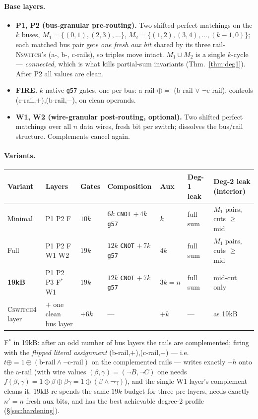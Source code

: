 \documentclass[11pt]{article}
\theoremstyle{remark}
\newcommand{\g}{\texttt{g57}}
\newcommand{\CNOT}{\texttt{CNOT}}
\newcommand{\NSW}{\textsc{Nswitch}}
\newcommand{\CSW}{\textsc{Cswitch4}}
\begin{document}
\paragraph{Base layers.}
\begin{itemize}
\item \textbf{P1, P2 (bus-granular pre-routing).} Two shifted perfect matchings on the $k$
buses, $M_1=\{(0,1),(2,3),\dots\}$, $M_2=\{(1,2),(3,4),\dots,(k{-}1,0)\}$; each matched bus pair
gets \emph{one fresh aux bit} shared by its three rail-\NSW's (a-, b-, c-rails), so triples move
intact. $M_1\cup M_2$ is a single $k$-cycle --- \emph{connected}, which is what kills
partial-sum invariants (Thm.~\ref{thm:deg1}). After P2 all values are clean.
\item \textbf{FIRE.} $k$ native \g{} gates, one per bus:
a-rail $\mathrel{\oplus{=}}$ (b-rail $\vee$ $\neg$c-rail), controls (c-rail,$+$),(b-rail,$-$),
on clean operands.
\item \textbf{W1, W2 (wire-granular post-routing, optional).} Two shifted perfect matchings over
all $n$ data wires, fresh bit per switch; dissolves the bus/rail structure. Complements cancel
again.
\end{itemize}

\paragraph{Variants.}
\begin{center}
\footnotesize
\begin{tabular}{lllllll}
\toprule
Variant & Layers & Gates & Composition & Aux & Deg-1 leak & Deg-2 leak (interior)\\
\midrule
Minimal & P1 P2 F & $10k$ & $6k$ \CNOT{} $+\,4k$ \g & $k$ & full sum & $M_1$ pairs, cuts $\ge$ mid\\
Full & P1 P2 F W1 W2 & $19k$ & $12k$ \CNOT{} $+\,7k$ \g & $4k$ & full sum & $M_1$ pairs, cuts $\ge$ mid\\
\textbf{19kB} & P1 P2 P3 F$^{*}$ W1 & $19k$ & $12k$ \CNOT{} $+\,7k$ \g & $3k=n$ & full sum & mid-cut only\\
\CSW{} layer & $+$ one clean bus layer & $+6k$ & --- & $+k$ & --- & as 19kB\\
\bottomrule
\end{tabular}
\end{center}

F$^{*}$ in 19kB: after an odd number of bus layers the rails are complemented; firing with the
\emph{flipped literal assignment} (b-rail,$+$),(c-rail,$-$) --- i.e.\
$t\mathrel{\oplus{=}}1\oplus(\text{b-rail}\wedge\neg\text{c-rail})$ on the complemented rails ---
writes exactly $\neg h$ onto the a-rail (with wire values $(\beta,\gamma)=(\neg B,\neg C)$ one
needs $f(\beta,\gamma)=1\oplus\beta\oplus\beta\gamma=1\oplus(\beta\wedge\neg\gamma)$), and the
single W1 layer's complement cleans it. 19kB re-spends the same $19k$ budget for three
pre-layers, needs exactly $n'=n$ fresh aux bits, and has the best achievable degree-2 profile
(\S\ref{sec:hardening}).
\end{document}
